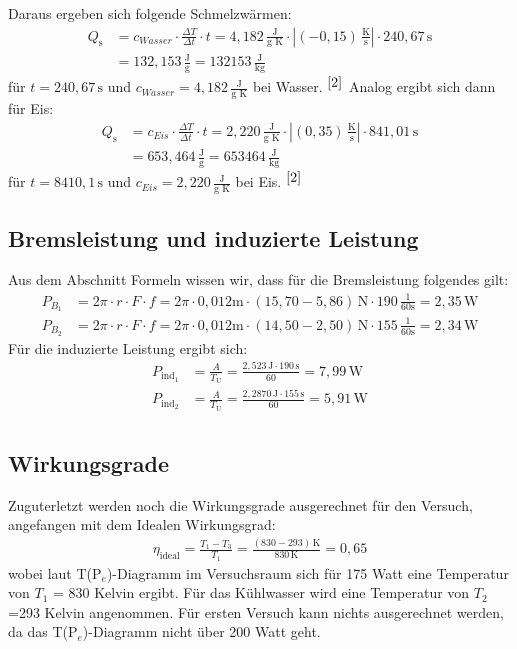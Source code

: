 \documentclass[fontsize=12pt]{scrartcl}
\renewcommand{\l}{\left\vert}
\renewcommand{\r}{\right\vert}
\begin{document}
Daraus ergeben sich folgende Schmelzwärmen:
\begin{align*}
Q_{\text{s}} &= c_{Wasser}\cdot \frac{\Delta T}{\Delta t} \cdot t = 4, 182\,\frac{\text{J}}{\text{g K}} \cdot \l(-0,15)\,\frac{\text{K}}{\text{s}}\r \cdot 240,67\,\text{s}\\
&= 132,153\,\frac{\text{J}}{\text{g}}= 132153\,\frac{\text{J}}{\text{kg}} 
\end{align*}
für $t=240,67\,\text{s}$ und $c_{Wasser}= 4, 182\,\frac{\text{J}}{\text{g K}}$ bei Wasser. $^{\cite{2}}$ Analog ergibt sich dann für Eis:
\begin{align*}
Q_{\text{s}} &= c_{Eis}\cdot \frac{\Delta T}{\Delta t} \cdot t = 2,220\,\frac{\text{J}}{\text{g K}} \cdot \l(0,35)\,\frac{\text{K}}{\text{s}}\r \cdot 841,01\,\text{s}\\
&= 653,464\,\frac{\text{J}}{\text{g}}= 653464\,\frac{\text{J}}{\text{kg}} 
\end{align*}
für $t=8410,1\,\text{s}$ und $c_{Eis}= 2,220\,\frac{\text{J}}{\text{g K}}$ bei Eis.  $^{\cite{2}}$
\newpage
\subsection{Bremsleistung und induzierte Leistung}

Aus dem Abschnitt Formeln wissen wir, dass für die Bremsleistung folgendes gilt:
\begin{align*}
P_{B_1} &= 2\pi \cdot  r \cdot F \cdot f = 2\pi \cdot 0,012\text{m} \cdot (15,70-5,86)\,\text{N} \cdot 190\,\frac{1}{60\text{s}} = 2,35\,\text{W}\\
P_{B_2} &=  2\pi \cdot  r \cdot F \cdot f = 2\pi \cdot 0,012\text{m} \cdot (14,50-2,50)\,\text{N} \cdot 155\,\frac{1}{60\text{s}} = 2,34\,\text{W}
\end{align*}
Für die induzierte Leistung ergibt sich:
\begin{align*}
P_{\text{ind}_1}& = \frac{A}{T_{\text{U}}} =\frac{2,523\,\text{J} \cdot 190 \,\text{s}}{60} = 7,99\,\text{W} \\
P_{\text{ind}_2}& = \frac{A}{T_{\text{U}}} =\frac{2,2870\,\text{J} \cdot 155 \,\text{s}}{60} =5,91\,\text{W} \\
\end{align*}

\subsection{Wirkungsgrade}

Zuguterletzt werden noch die Wirkungsgrade ausgerechnet für den Versuch, angefangen mit dem Idealen Wirkungsgrad:
\begin{align*}
\eta_{\text{ideal}}= \frac{T_1 -T_3}{T_1} = \frac{(830 -293)\,\text{K}}{830\,\text{K}} = 0,65
\end{align*}
wobei laut T(P$_e$)-Diagramm im Versuchsraum sich für 175 Watt eine Temperatur von $T_1$ = 830 Kelvin ergibt. Für das Kühlwasser wird eine Temperatur von  $T_2$ =293 Kelvin angenommen. Für ersten Versuch kann nichts ausgerechnet werden, da das T(P$_e$)-Diagramm nicht über 200 Watt geht. \par
\end{document}
